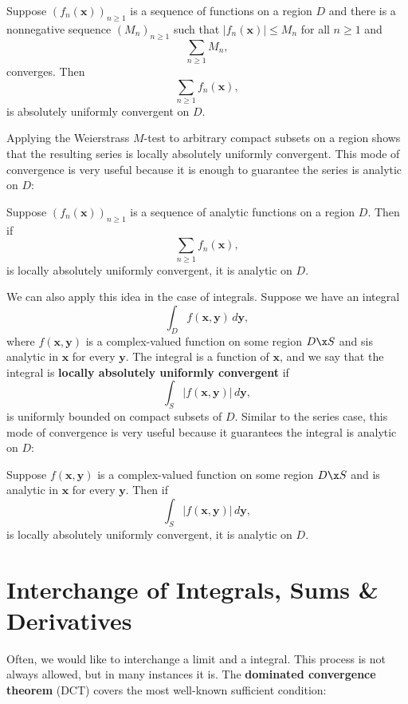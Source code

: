     \begin{theorem}
      Suppose $(f_{n}(\mathbf{x}))_{n \ge 1}$ is a sequence of functions on a region $D$ and there is a nonnegative sequence $(M_{n})_{n \ge 1}$ such that $|f_{n}(\mathbf{x})| \le M_{n}$ for all $n \ge 1$ and
      \[
        \sum_{n \ge 1}M_{n},
      \]
      converges. Then
      \[
        \sum_{n \ge 1}f_{n}(\mathbf{x}),
      \]
      is absolutely uniformly convergent on $D$.
    \end{theorem}

    Applying the Weierstrass $M$-test to arbitrary compact subsets on a region shows that the resulting series is locally absolutely uniformly convergent. This mode of convergence is very useful because it is enough to guarantee the series is analytic on $D$:

    \begin{theorem}
      Suppose $(f_{n}(\mathbf{x}))_{n \ge 1}$ is a sequence of analytic functions on a region $D$. Then if
      \[
        \sum_{n \ge 1}f_{n}(\mathbf{x}),
      \]
      is locally absolutely uniformly convergent, it is analytic on $D$.
    \end{theorem}

    We can also apply this idea in the case of integrals. Suppose we have an integral
    \[
      \int_{D}f(\mathbf{x},\mathbf{y})\,d\mathbf{y},
    \]
    where $f(\mathbf{x},\mathbf{y})$ is a complex-valued function on some region $D \x S$ and sis analytic in $\mathbf{x}$ for every $\mathbf{y}$. The integral is a function of $\mathbf{x}$, and we say that the integral is \textbf{locally absolutely uniformly convergent} if
    \[
      \int_{S}|f(\mathbf{x},\mathbf{y})|\,d\mathbf{y},
    \]
    is uniformly bounded on compact subsets of $D$. Similar to the series case, this mode of convergence is very useful because it guarantees the integral is analytic on $D$:

    \begin{theorem}\label{thm:analytic_integral}
      Suppose $f(\mathbf{x},\mathbf{y})$ is a complex-valued function on some region $D \x S$ and is analytic in $\mathbf{x}$ for every $\mathbf{y}$. Then if
      \[
        \int_{S}|f(\mathbf{x},\mathbf{y})|\,d\mathbf{y},
      \]
      is locally absolutely uniformly convergent, it is analytic on $D$.
    \end{theorem}
  \section{Interchange of Integrals, Sums \& Derivatives}
    Often, we would like to interchange a limit and a integral. This process is not always allowed, but in many instances it is. The \textbf{dominated convergence theorem} (DCT) covers the most well-known sufficient condition:


